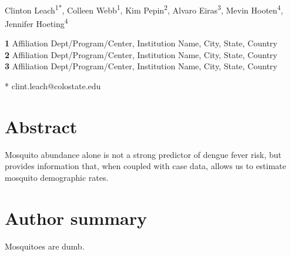 \documentclass[10pt,letterpaper]{article}
\date{}
\begin{document}
\vspace*{0.2in}

\begin{flushleft}
{\Large
\textbf{}
}
\newline
\\
Clinton Leach\textsuperscript{1*},
Colleen Webb\textsuperscript{1},
Kim Pepin\textsuperscript{2},
Alvaro Eiras\textsuperscript{3},
Mevin Hooten\textsuperscript{4},
Jennifer Hoeting\textsuperscript{4}

\bigskip
\textbf{1} Affiliation Dept/Program/Center, Institution Name, City, State, Country
\\
\textbf{2} Affiliation Dept/Program/Center, Institution Name, City, State, Country
\\
\textbf{3} Affiliation Dept/Program/Center, Institution Name, City, State, Country
\\
\bigskip

% 


* clint.leach@colostate.edu

\end{flushleft}
\section*{Abstract}

Mosquito abundance alone is not a strong predictor of dengue fever risk, but provides information that, when coupled with case data, allows us to estimate mosquito demographic rates.

\section*{Author summary}

Mosquitoes are dumb.
\end{document}
